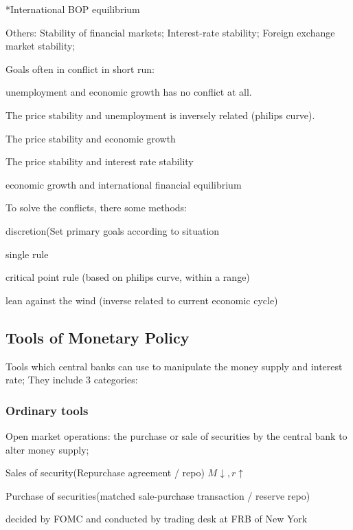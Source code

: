 \documentclass[10pt, a4paper]{article}
\begin{document}
        *International BOP equilibrium
        
        Others: Stability of financial markets; Interest-rate stability; Foreign exchange market stability;

        Goals often in conflict in short run:
        
        \quad unemployment and economic growth has no conflict at all.
        
        \quad The price stability and unemployment is inversely related (philips curve).

        \quad The price stability and economic growth

        \quad The price stability and interest rate stability 

        \quad economic growth and international financial equilibrium

        \medskip 
        
        \medskip 

        To solve the conflicts, there some methods: 
        
        \quad discretion(Set primary goals according to situation
        
        \quad single rule    

        \quad critical point rule (based on philips curve, within a range) 

        \quad lean against the wind (inverse related to current economic cycle)

    \subsection{Tools of Monetary Policy}
        Tools which central banks can use to manipulate the money supply and interest rate; They include 3 categories: 

        \subsubsection{Ordinary tools}
        
        Open market operations: the purchase or sale of securities by the central bank to alter money supply; 
        
        \quad Sales  of security(Repurchase agreement / repo) $M\downarrow, r\uparrow$

        \quad Purchase of securities(matched sale-purchase transaction / reserve repo)

        \quad decided by FOMC and conducted by trading desk at FRB of New York 
\end{document}
